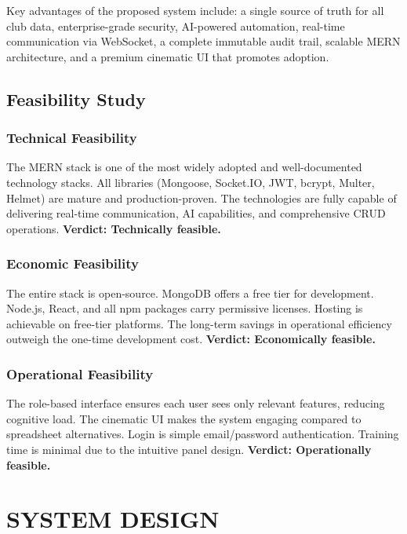 \documentclass[12pt,a4paper,oneside]{report}
\begin{document}
Key advantages of the proposed system include: a single source of truth for all club data, enterprise-grade security, AI-powered automation, real-time communication via WebSocket, a complete immutable audit trail, scalable MERN architecture, and a premium cinematic UI that promotes adoption.

\section{Feasibility Study}

\subsection{Technical Feasibility}
The MERN stack is one of the most widely adopted and well-documented technology stacks. All libraries (Mongoose, Socket.IO, JWT, bcrypt, Multer, Helmet) are mature and production-proven. The technologies are fully capable of delivering real-time communication, AI capabilities, and comprehensive CRUD operations. \textbf{Verdict: Technically feasible.}

\subsection{Economic Feasibility}
The entire stack is open-source. MongoDB offers a free tier for development. Node.js, React, and all npm packages carry permissive licenses. Hosting is achievable on free-tier platforms. The long-term savings in operational efficiency outweigh the one-time development cost. \textbf{Verdict: Economically feasible.}

\subsection{Operational Feasibility}
The role-based interface ensures each user sees only relevant features, reducing cognitive load. The cinematic UI makes the system engaging compared to spreadsheet alternatives. Login is simple email/password authentication. Training time is minimal due to the intuitive panel design. \textbf{Verdict: Operationally feasible.}


\chapter{SYSTEM DESIGN}
\end{document}

